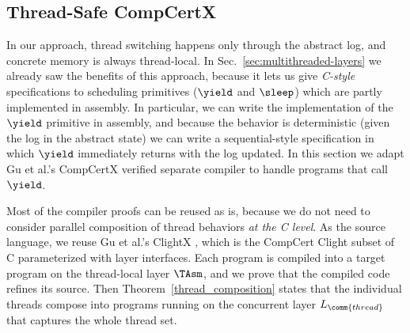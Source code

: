 \subsection{Thread-Safe CompCertX}
\label{sec:old:comp}

In our approach, thread switching happens only through the 
abstract log, and concrete memory is always thread-local.
In Sec.~\ref{sec:multithreaded-layers} we already saw the benefits of this approach, because it lets us
give \emph{C-style} specifications to scheduling primitives
($\yield$ and $\sleep$) which are partly implemented in assembly. In particular, we can write the
implementation of the $\yield$ primitive in assembly, and because the
behavior is deterministic (given the log in the abstract state) we can
write a sequential-style specification in which $\yield$ immediately
returns with the log updated. 
In this section we adapt Gu et al.'s CompCertX verified
separate compiler \cite[\S 6]{dscal15} to handle programs that call $\yield$.

Most of the compiler proofs can be reused as is, because we
do not need to consider parallel composition of thread behaviors
\emph{at the C level}. As the source language, we reuse Gu et al.'s
ClightX \cite[\S 4]{dscal15}, which is the CompCert
Clight subset of C parameterized with layer interfaces.
Each program is compiled into a
target program on the thread-local layer $\TAsm$, and we prove that the
compiled code refines its source. Then Theorem~\ref{thread_composition}
states that the individual threads compose into programs
running on the concurrent
 layer $L_\comm{thread}$ that captures the whole thread set.

